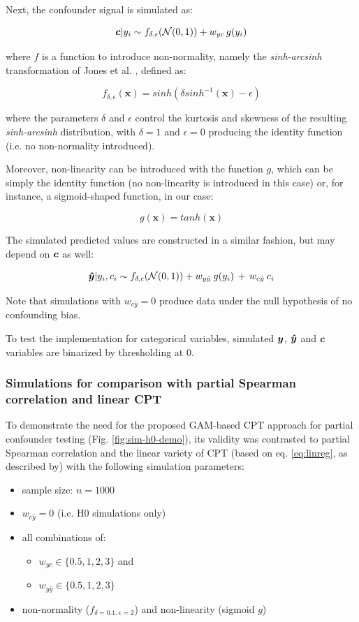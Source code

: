 \documentclass{article}
\begin{document}
Next, the confounder signal is simulated as:

$$ \boldsymbol{c} | y_i \sim f_{\delta, \epsilon}(\mathcal{N}(0, 1)) + w_{yc} \, g(y_i) $$

where $f$ is a function to introduce non-normality, namely the \emph{sinh-arcsinh} transformation of Jones et al. \cite{jones2009sinh}, defined as:

$$f_{\delta, \epsilon}(\boldsymbol{x}) = sinh(\delta sinh^{-1}(\boldsymbol{x}) - \epsilon)$$

where the parameters $\delta$ and $\epsilon$ control the kurtosis and skewness of the resulting \emph{sinh-arcsinh} distribution, with $\delta=1$ and $\epsilon=0$ producing the identity function (i.e. no non-normality introduced).

Moreover, non-linearity can be introduced with the function $g$, which can be simply the identity function (no non-linearity is introduced in this case) or, for instance, a sigmoid-shaped function, in our case:

$$ g(\boldsymbol{x}) = tanh(\boldsymbol{x}) $$


The simulated predicted values are constructed in a similar fashion, but may depend on $\boldsymbol{c}$ as well:

$$ \boldsymbol{\hat{y}} | y_i, c_i \sim f_{\delta, \epsilon}(\mathcal{N}(0, 1)) + w_{y\hat{y}} \: g(y_i) \, + \, w_{c\hat{y}} \: c_i$$

Note that simulations with $w_{c\hat{y}}=0$ produce data under the null hypothesis of no confounding bias.

To test the implementation for categorical variables, simulated $\boldsymbol{y}$, $\boldsymbol{\hat{y}}$ and $\boldsymbol{c}$ variables are binarized by thresholding at 0.

\subsubsection*{Simulations for comparison with partial Spearman correlation and linear CPT}

To demonstrate the need for the proposed GAM-based CPT approach for partial confounder testing (Fig. \ref{fig:sim-h0-demo}), its validity was contrasted to partial Spearman correlation and the linear variety of CPT (based on eq. \ref{eq:linreg}, as described by\cite{berrett2020conditional}) with the following simulation parameters:
\begin{itemize}
    \item sample size: $n = 1000$
    \item $w_{c\hat{y}} = 0$ (i.e. H0 simulations only)
    \item all combinations of:
    \begin{itemize}
        \item $w_{yc} \in \{0.5, 1, 2, 3\}$ and
        \item $w_{y\hat{y}} \in \{0.5, 1, 2, 3\}$
    \end{itemize}
    \item non-normality ($f_{\delta = 0.1, \epsilon = 2}$) and non-linearity (sigmoid $g$)
\end{itemize}
\end{document}
